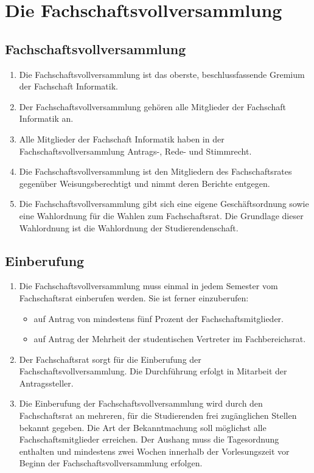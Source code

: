 \section {Die Fachschaftsvollversammlung}

\subsection{Fachschaftsvollversammlung}
\begin{enumerate}
\item Die Fachschaftsvollversammlung ist das oberste, beschlussfassende Gremium der Fachschaft Informatik.
\item Der Fachschaftsvollversammlung gehören alle Mitglieder der Fachschaft Informatik an.
\item Alle Mitglieder der Fachschaft Informatik haben in der Fachschaftsvollversammlung Antrags-, Rede- und Stimmrecht.
\item Die Fachschaftsvollversammlung ist den Mitgliedern des Fachschaftsrates gegenüber Weisungsberechtigt und nimmt deren Berichte entgegen.
\item Die Fachschaftsvollversammlung gibt sich eine eigene Geschäftsordnung sowie eine Wahlordnung für die Wahlen zum Fachschaftsrat. Die Grundlage dieser Wahlordnung ist die Wahlordnung der Studierendenschaft.
\end{enumerate}

\subsection{Einberufung}
\begin{enumerate}
\item Die Fachschaftsvollversammlung muss einmal in jedem Semester vom Fachschaftsrat einberufen werden. Sie ist ferner einzuberufen:
\begin{itemize}
\item auf Antrag von mindestens fünf Prozent der Fachschaftsmitglieder.
\item auf Antrag der Mehrheit der studentischen Vertreter im Fachbereichsrat.
\end{itemize}
\item Der Fachschaftsrat sorgt für die Einberufung der Fachschaftsvollversammlung. Die Durchführung erfolgt in Mitarbeit der Antragssteller.
\item Die Einberufung der Fachschaftsvollversammlung wird durch den Fachschaftsrat an mehreren, für die Studierenden frei zugänglichen Stellen bekannt gegeben. Die Art der Bekanntmachung soll möglichst alle Fachschaftsmitglieder erreichen. Der Aushang muss die Tagesordnung enthalten und mindestens zwei Wochen innerhalb der Vorlesungszeit vor Beginn der Fachschaftsvollversammlung erfolgen.
\end{enumerate}

